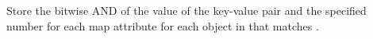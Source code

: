 Store the bitwise AND of the value of the key-value pair and the specified
number for each map attribute for each object in  that matches
.


